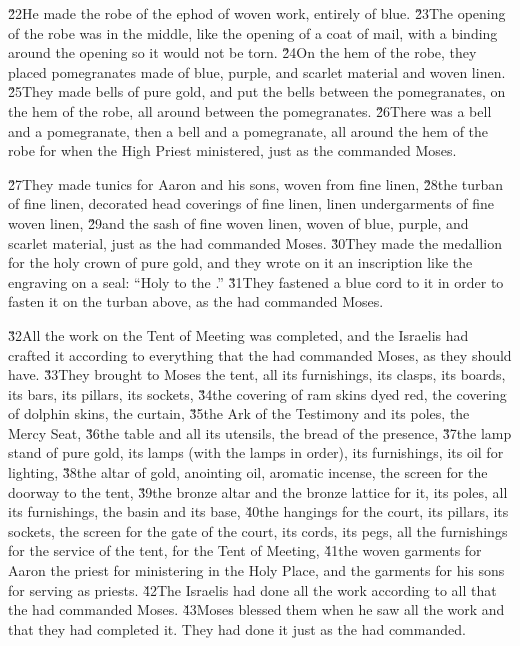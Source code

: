 \v{22}He made the robe of the ephod of woven work, entirely of blue. \v{23}The opening of the robe was in the middle, like the opening of a coat of mail, with a binding around the opening so it would not be torn. \v{24}On the hem of the robe, they placed pomegranates made of blue, purple, and scarlet material and woven linen. \v{25}They made bells of pure gold, and put the bells between the pomegranates, on the hem of the robe, all around between the pomegranates. \v{26}There was a bell and a pomegranate, then a bell and a pomegranate, all around the hem of the robe for when the High Priest ministered, just as the  commanded Moses.

\v{27}They made tunics for Aaron and his sons, woven from fine linen, \v{28}the turban of fine linen, decorated head coverings of fine linen, linen undergarments of fine woven linen, \v{29}and the sash of fine woven linen, woven of blue, purple, and scarlet material, just as the  had commanded Moses. \v{30}They made the medallion for the holy crown of pure gold, and they wrote on it an inscription like the engraving on a seal: ``Holy to the .'' \v{31}They fastened a blue cord to it in order to fasten it on the turban above, as the  had commanded Moses.

\v{32}All the work on the Tent of Meeting was completed, and the Israelis had crafted it according to everything that the  had commanded Moses, as they should have. \v{33}They brought to Moses the tent, all its furnishings, its clasps, its boards, its bars, its pillars, its sockets, \v{34}the covering of ram skins dyed red, the covering of dolphin skins, the curtain, \v{35}the Ark of the Testimony and its poles, the Mercy Seat, \v{36}the table and all its utensils, the bread of the presence, \v{37}the lamp stand of pure gold, its lamps (with the lamps in order), its furnishings, its oil for lighting, \v{38}the altar of gold, anointing oil, aromatic incense, the screen for the doorway to the tent, \v{39}the bronze altar and the bronze lattice for it, its poles, all its furnishings, the basin and its base, \v{40}the hangings for the court, its pillars, its sockets, the screen for the gate of the court, its cords, its pegs, all the furnishings for the service of the tent, for the Tent of Meeting, \v{41}the woven garments for Aaron the priest for ministering in the Holy Place, and the garments for his sons for serving as priests. \v{42}The Israelis had done all the work according to all that the  had commanded Moses. \v{43}Moses blessed them when he saw all the work and that they had completed it. They had done it just as the  had commanded.

